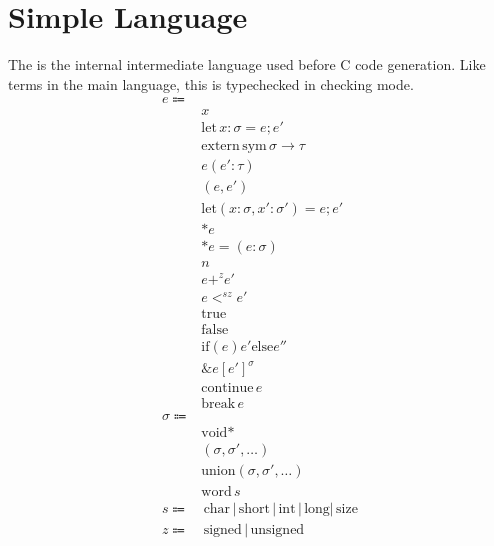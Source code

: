 \documentclass {article}
\begin{document}
\section{Simple Language}
The is the internal intermediate language used before C code generation.
Like terms in the main language, this is typechecked in checking mode.
\begin{align*}
e \Coloneqq & \\
& x \\
& \text{let} \, x : \sigma = e; e' \\
& \text{extern} \, \text{sym} \, \sigma \to \tau \\
& e(e' : \tau) \\
& (e,e') \\
& \text{let} (x: \sigma, x' : \sigma') = e; e' \\
& * e \\
& * e = (e : \sigma) \\
& n \\
& e +^z e' \\
& e <^{sz} e' \\
& \text{true} \\
& \text{false} \\
& \text{if} (e) {e'} \text{else} {e''} \\
& \&e[e']^\sigma \\
& \text{continue} \, e \\
& \text{break} \, e \\
\sigma \Coloneqq & \\
& \text{void}* \\ 
& (\sigma, \sigma', \dots) \\
& \text{union} (\sigma, \sigma', \dots) \\
& \text{word} \, s \\
s \Coloneqq & \, \text{char} \, | \, \text{short} \, | \, \text{int} \, | \, \text{long} | \, \text{size} \\
z \Coloneqq & \, \text{signed} \, | \, \text{unsigned}
\end{align*}
\end{document}
